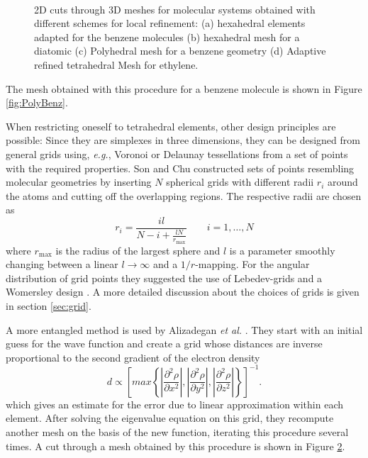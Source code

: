 \begin{figure}
\begin{subfigure}{0.23\textwidth}
   \vspace{-44mm}\caption{$\qquad\quad\qquad\qquad$}
   \label{fig:AdapEthyl}
  \end{subfigure}
  \vspace{34mm}
  \caption{2D cuts through 3D meshes for molecular systems obtained with different schemes for local refinement:
    (a) hexahedral elements adapted for the benzene molecules \cite{fe_dft1}
    (b) hexahedral mesh for a diatomic \cite{fe_hf}
    (c) Polyhedral mesh for a benzene geometry \cite{fe_dft2}
    (d) Adaptive refined tetrahedral Mesh for ethylene. \cite{fe_hf}
    }
\end{figure}
The mesh obtained with this procedure for a benzene molecule \cite{fe_dft1} is shown in Figure \ref{fig:PolyBenz}.

When restricting oneself to tetrahedral elements, other design principles are possible: Since they are simplexes in three dimensions, they can be designed from general grids using, \textit{e.g.}, Voronoi \cite{voronoi} or Delaunay \cite{delaunay} tessellations %
from a set of points with the required properties.
Son and Chu \cite{Son_Chu, Son_Chu0} constructed sets of points resembling molecular geometries by inserting $N$ spherical grids with different radii $r_i$ around the atoms and cutting off the overlapping regions.
The respective radii are chosen as
\begin{equation}
r_i=\frac{il}{N-i+\frac{lN}{r_\text{max}}} \qquad i=1,\hdots ,N 
\end{equation}
where $r_\text{max}$ is the radius of the largest sphere and $l$ is a parameter smoothly changing between a linear $l\rightarrow \infty$ and a $1/r$-mapping.
For the angular distribution of grid points they suggested the use of Lebedev-grids \cite{lebedev} and a Womersley design \cite{Womersley2001,Sloan}.
A more detailed discussion about the choices of grids is given in section \ref{sec:grid}.

A more entangled method is used by Alizadegan \textit{et al.} \cite{fe_hf}. 
They start with an initial guess for the wave function and create a grid whose distances are inverse proportional to the second gradient of the electron density
\begin{equation}
d \propto \left[ max\left\{\left|\frac{\partial^2 \rho}{\partial x^2}\right| ,
                           \left|\frac{\partial^2 \rho}{\partial y^2}\right| ,
                           \left|\frac{\partial^2 \rho}{\partial z^2}\right| \right\} \right]^{-1}.
\end{equation}
which gives an estimate for the error due to linear approximation within each element.
After solving the eigenvalue equation on this grid, they recompute another mesh on the basis of the new function, iterating this procedure several times.
A cut through a mesh obtained by this procedure is shown in Figure \ref{fig:AdapEthyl}.

